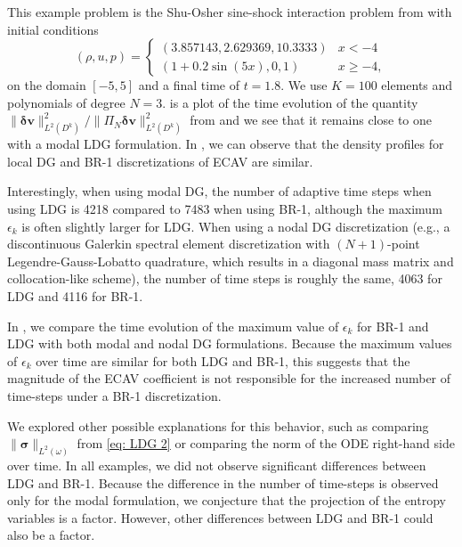 \documentclass{elsarticle}
\theoremstyle{definition}
\theoremstyle{plain}
\theoremstyle{plain}
\newcommand{\reftwo}[1]{{\color{blue}#1}}
\renewcommand{\reftwo}[1]{#1}
\begin{document}
This example problem is the Shu-Osher sine-shock interaction problem from \cite{shu2009high} with initial conditions
$$
(\rho, u, p) = \begin{cases}
    (3.857143, 2.629369,10.3333) & x < -4\\
    (1 + 0.2\sin{(5x)},0,1) & x \geq -4,
\end{cases}
$$
on the domain $[-5,5]$ and a final time of $t = 1.8$. We use $K = 100$ elements and polynomials of degree $N = 3$.  is a plot of the time evolution of the quantity \reftwo{$\|\bm{\delta v}\|^2_{L^2(D^k)}/\|\Pi_N\bm{\delta v}\|^2_{L^2(D^k)}$} from  and we see that it remains close to one with a modal LDG formulation. In , we can observe that the density profiles for local DG and BR-1 discretizations of ECAV are similar.  


Interestingly, when using modal DG, the number of adaptive time steps when using LDG is 4218 compared to 7483 when using BR-1, although the maximum $\epsilon_k$ is often slightly larger for LDG. When using a nodal DG discretization (e.g., a discontinuous Galerkin spectral element discretization with $(N+1)$-point Legendre-Gauss-Lobatto quadrature, which results in a diagonal mass matrix and collocation-like scheme), the number of time steps is roughly the same, 4063 for LDG and 4116 for BR-1. 

In , we compare the time evolution of the maximum value of $\epsilon_k$ for BR-1 and LDG with both modal and nodal DG formulations. Because the maximum values of $\epsilon_k$ over time are similar for both LDG and BR-1, this suggests that the magnitude of the ECAV coefficient is not responsible for the increased number of time-steps under a BR-1 discretization. 

We explored other possible explanations for this behavior, such as  comparing $\|\bm{\sigma}\|_{L^2(\omega)}$ from \eqref{eq: LDG 2} or comparing the norm of the ODE right-hand side over time. In all examples, we did not observe significant differences between LDG and BR-1. Because the difference in the number of time-steps is observed only for the modal formulation, we conjecture that the projection of the entropy variables is a factor. However, other differences between LDG and BR-1 \cite{alhawwary2019study} could also be a factor.
\end{document}
